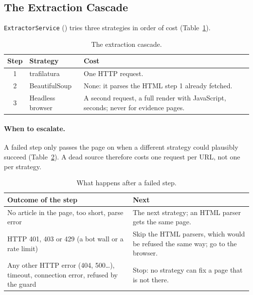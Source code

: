 
\subsection{The Extraction Cascade}
\label{subsec:scraping-cascade}

\texttt{ExtractorService} () tries
three strategies in order of cost (Table~\ref{tab:cascade}).

\begin{table}[ht]
\centering
\small
\caption{The extraction cascade.}
\label{tab:cascade}
\begin{tabularx}{\linewidth}{@{}clX@{}}
\toprule
Step & Strategy & Cost \\
\midrule
1 & trafilatura           & One HTTP request. \\
2 & BeautifulSoup         & None: it parses the HTML step 1 already
                            fetched. \\
3 & Headless browser      & A second request, a full render with
                            JavaScript, seconds; never for evidence
                            pages. \\
\bottomrule
\end{tabularx}
\end{table}

\paragraph{When to escalate.} A failed step only passes the page on
when a different strategy could plausibly succeed
(Table~\ref{tab:escalation}). A dead source therefore costs one request
per URL, not one per strategy.

\begin{table}[ht]
\centering
\small
\caption{What happens after a failed step.}
\label{tab:escalation}
\begin{tabularx}{\linewidth}{@{}p{5.2cm}X@{}}
\toprule
Outcome of the step & Next \\
\midrule
No article in the page, too short, parse error
& The next strategy; an HTML parser gets the same page. \\
HTTP 401, 403 or 429 (a bot wall or a rate limit)
& Skip the HTML parsers, which would be refused the same way; go to the
  browser. \\
Any other HTTP error (404, 500\ldots), timeout, connection error,
refused by the guard
& Stop: no strategy can fix a page that is not there. \\
\bottomrule
\end{tabularx}
\end{table}

